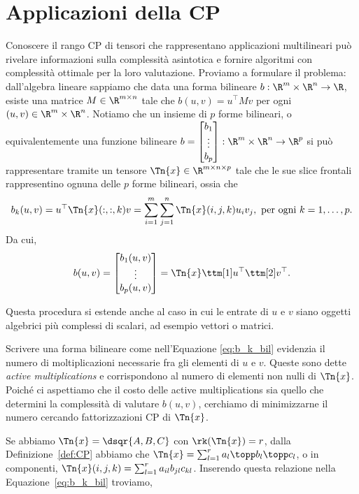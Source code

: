 \section{Applicazioni della CP}

Conoscere il rango CP di tensori che rappresentano applicazioni multilineari può rivelare
informazioni sulla complessità asintotica e fornire algoritmi con complessità ottimale per la loro
valutazione. Proviamo a formulare il problema: dall'algebra lineare sappiamo che data una forma
bilineare $ b : \R^m \times \R^n \to \R $, esiste una matrice $ M \in \R^{m \times n} $ tale che $
b(u,v) = u^{\top}Mv$ per ogni $ (u,v) \in \R^m \times \R^n $.
Notiamo che un insieme di $ p $ forme bilineari, o equivalentemente una funzione bilineare $
b = \begin{bmatrix} b_1 \\ \vdots \\ b_p \end{bmatrix} :  \R^m \times \R^n  \to \R^p$ si può
rappresentare tramite un tensore $ \Tn{x} \in \R^{m \times n\times p} $ tale che le sue slice
frontali rappresentino ognuna delle $ p $ forme bilineari, ossia che
\begin{equation}
  \label{eq:b_k_bil}
  b_k(u,v) = u^{\top}\Tn{x}(:,:,k)v = \sum_{i=1}^m\sum_{j=1}^n \Tn{x}(i,j,k)u_iv_j, \text{ per ogni
  } k = 1, \ldots, p
.\end{equation}
Da cui, 
\begin{equation}
  \label{eq:b_tuv}
 b(u,v) = \begin{bmatrix} b_1(u,v) \\ \vdots \\ b_p(u,v) \end{bmatrix} = \Tn{x} \ttm[1] u^{\top}
 \ttm[2] v^{\top}.
\end{equation}
\begin{remark}
  Questa procedura si estende anche al caso in cui le entrate di $ u $ e $ v $ siano oggetti
  algebrici più complessi di scalari, ad esempio vettori o matrici.
\end{remark}
\begin{remark}
  Scrivere una forma bilineare come nell'Equazione \ref{eq:b_k_bil} evidenzia il numero di
  moltiplicazioni necessarie fra gli elementi di $ u $ e $ v $. Queste sono dette \emph{active
  multiplications} e corrispondono al numero di elementi non nulli di $ \Tn{x} $. Poiché ci aspettiamo che
  il costo delle active multiplications sia quello che determini la complessità di valutare $ b(u,v)
  $, cerchiamo di minimizzarne il numero cercando fattorizzazioni CP di $ \Tn{x} $.
\end{remark}
Se abbiamo $ \Tn{x} = \dsqr{A,B,C} $ con $ \rk(\Tn{x}) = r$, dalla Definizione~\ref{def:CP} abbiamo che $ \Tn{x} = \sum_{l=1}^r a_l \topp b_l \topp c_l $, o in componenti, $ \Tn{x}(i,j,k) = \sum_{l=1}^r a_{il}b_{jl}c_{kl} $. Inserendo questa relazione nella Equazione~\ref{eq:b_k_bil} troviamo,


